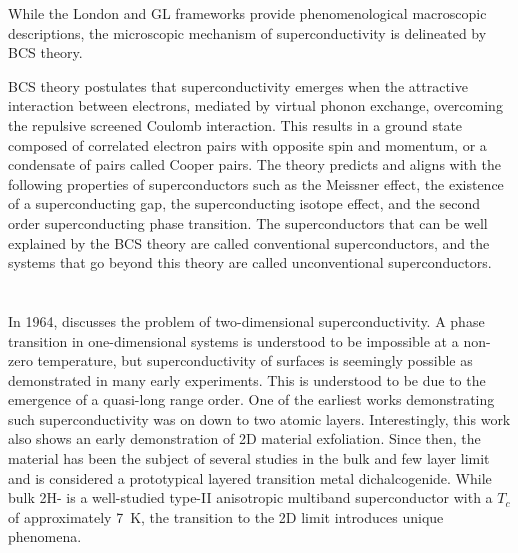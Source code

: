 While the London and \gls{GL} frameworks provide phenomenological macroscopic descriptions, the microscopic mechanism of superconductivity is delineated by \gls{BCS} theory\cite{bardeenTheorySuperconductivity1957}. 

\gls{BCS} theory postulates that superconductivity emerges when the attractive interaction between electrons, mediated by virtual phonon exchange, overcoming the repulsive screened Coulomb interaction. This results in a ground state composed of correlated electron pairs with opposite spin and momentum, or a condensate of pairs called Cooper pairs. The theory predicts and aligns with the following properties of superconductors such as the Meissner effect, the existence of a superconducting gap, the superconducting isotope effect, and the second order superconducting phase transition. The superconductors that can be well explained by the \gls{BCS} theory are called conventional superconductors, and the systems that go beyond this theory are called unconventional superconductors.

\section{}

In 1964, \citeauthor{ginzburgTwodimensionalSuperconductors1989} discusses the problem of two-dimensional superconductivity\cite{ginzburgTwodimensionalSuperconductors1989}. A phase transition in one-dimensional systems is understood to be impossible at a non-zero temperature\cite{merminAbsenceFerromagnetismAntiferromagnetism1966}, but superconductivity of surfaces is seemingly possible as demonstrated in many early experiments. This is understood to be due to the emergence of a quasi-long range order. One of the earliest works demonstrating such superconductivity was on  down to two atomic layers\cite{frindtSuperconductivityUltrathinNb1972}. Interestingly, this work also shows an early demonstration of 2D material exfoliation. Since then, the material has been the subject of several studies in the bulk and few layer limit and is considered a prototypical layered transition metal dichalcogenide. While bulk 2H- is a well-studied type-II anisotropic multiband superconductor with a $T_c$ of approximately \qty{7}{\kelvin}, the transition to the 2D limit introduces unique phenomena.

